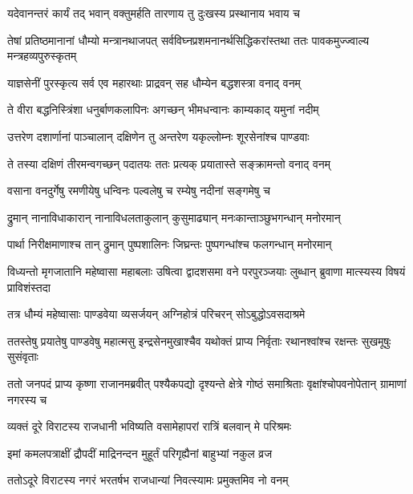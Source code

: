 \twolineshloka
{यदेवानन्तरं कार्यं तद् भवान् वक्तुमर्हति}
{तारणाय तु दुःखस्य प्रस्थानाय भवाय च}



\threelineshloka
{तेषां प्रतिष्ठमानानां धौम्यो मन्त्रानथाजपत्}
{सर्वविघ्नप्रशमनानर्थसिद्धिकरांस्तथा}
{ततः पावकमुज्ज्वाल्य मन्त्रहव्यपुरुस्कृतम्}


\twolineshloka
{याज्ञसेनीं पुरस्कृत्य सर्व एव महारथाः}
{प्राद्रवन् सह धौम्येन बद्धशस्त्रा वनाद् वनम्}


\twolineshloka
{ते वीरा बद्धनिस्त्रिंशा धनुर्बाणकलापिनः}
{अगच्छन् भीमधन्वानः काम्यकाद् यमुनां नदीम्}


\twolineshloka
{उत्तरेण दशार्णानां पाञ्चालान् दक्षिणेन तु}
{अन्तरेण यकृल्लोम्नः शूरसेनांश्च पाण्डवाः}


\twolineshloka
{ते तस्या दक्षिणं तीरमन्वगच्छन् पदातयः}
{ततः प्रत्यक् प्रयातास्ते सङ्क्रामन्तो वनाद् वनम्}


\twolineshloka
{वसाना वनदुर्गेषु रमणीयेषु धन्विनः}
{पल्वलेषु च रम्येषु नदीनां सङ्गमेषु च}


\twolineshloka
{द्रुमान् नानाविधाकारान् नानाविधलताकुलान्}
{कुसुमाढ्यान् मनःकान्ताञ्छुभगन्धान् मनोरमान्}


\twolineshloka
{पार्था निरीक्षमाणाश्च तान् द्रुमान् पुष्पशालिनः}
{जिघ्रन्तः पुष्पगन्धांश्च फलगन्धान् मनोरमान्}


\threelineshloka
{विध्यन्तो मृगजातानि महेष्वासा महाबलाः}
{उषित्वा द्वादशसमा वने परपुरञ्जयाः}
{लुब्धान् ब्रुवाणा मात्स्यस्य विषयं प्राविशंस्तदा}


\twolineshloka
{तत्र धौम्यं महेष्वासाः पाण्डवेया व्यसर्जयन्}
{अग्निहोत्रं परिचरन् सोऽबुद्धोऽवसदाश्रमे}


\threelineshloka
{ततस्तेषु प्रयातेषु पाण्डवेषु महात्मसु}
{इन्द्रसेनमुखाश्चैव यथोक्तं प्राप्य निर्वृताः}
{रथानश्वांश्च रक्षन्तः सुखमूषुः सुसंवृताः}


\onelineshloka
{ततो जनपदं प्राप्य कृष्णा राजानमब्रवीत्}
\twolineshloka
{पश्यैकपद्यो दृश्यन्ते क्षेत्रे गोष्ठं समाश्रिताः}
{वृक्षांश्चोपवनोपेतान् ग्रामाणां नगरस्य च}


\twolineshloka
{व्यक्तं दूरे विराटस्य राजधानी भविष्यति}
{वसामेहापरां रात्रिं बलवान् मे परिश्रमः}




\twolineshloka
{इमां कमलपत्राक्षीं द्रौपदीं माद्रिनन्दन}
{मुहूर्तं परिगृह्यैनां बाहुभ्यां नकुल व्रज}


\twolineshloka
{ततोऽदूरे विराटस्य नगरं भरतर्षभ}
{राजधान्यां निवत्स्यामः प्रमुक्तमिव नो वनम्}


